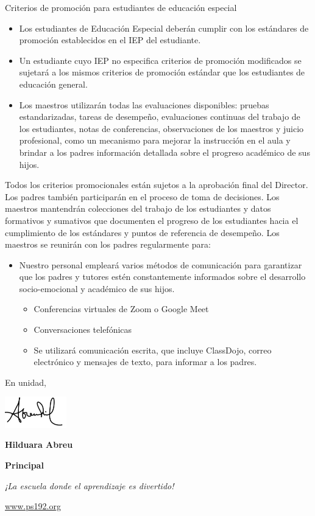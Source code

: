 \documentclass[12pt,letterpaper]{article}
\begin{document}
Criterios de promoción para estudiantes de educación especial\begin{itemize}
\item Los estudiantes de Educación Especial deberán cumplir con los estándares de promoción establecidos en el IEP del estudiante.
\item Un estudiante cuyo IEP no especifica criterios de promoción modificados se sujetará a los mismos criterios de promoción estándar que los estudiantes de educación general.
\item Los maestros utilizarán todas las evaluaciones disponibles: pruebas estandarizadas,
tareas de desempeño, evaluaciones continuas del trabajo de los estudiantes, notas de conferencias, observaciones de los maestros y juicio profesional, como un mecanismo para mejorar la instrucción en el aula y brindar a los padres información detallada sobre el progreso académico de sus hijos.
\end{itemize}
Todos los criterios promocionales están sujetos a la aprobación final del Director. Los padres también participarán en el proceso de toma de decisiones. Los maestros mantendrán colecciones del trabajo de los estudiantes y datos formativos y sumativos que documenten el progreso de los estudiantes hacia el cumplimiento de los estándares y puntos de referencia de desempeño. Los maestros se reunirán con los padres regularmente para:
\begin{itemize}
\pagebreak
\vspace*{1.5cm}
\item Nuestro personal empleará varios métodos de comunicación para garantizar que los padres y tutores estén constantemente informados sobre el desarrollo socio-emocional y académico de sus hijos.
	\begin{itemize}
	\item Conferencias virtuales de Zoom o Google Meet
	\item Conversaciones telefónicas
	\item Se utilizará comunicación escrita, que incluye ClassDojo, correo electrónico y mensajes de texto, para informar a los padres.
	\end{itemize}
\end{itemize}


En unidad,

\includegraphics[width=0.2\textwidth]{hil_signature}

\textbf{Hilduara Abreu}

\textbf{Principal}

\textit{¡La escuela donde el aprendizaje es divertido!}

\url{www.ps192.org}
\end{document}
